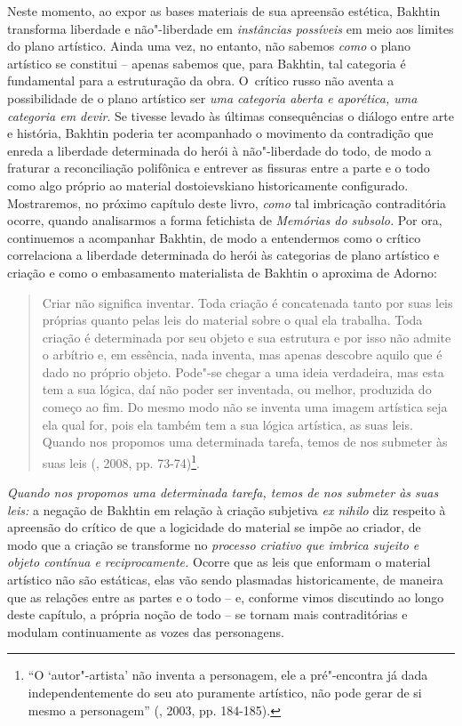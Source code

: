 {{Neste momento, ao expor as bases materiais de sua apreensão estética,
Bakhtin transforma liberdade e não"-liberdade em \emph{instâncias
possíveis} em meio aos limites do plano artístico. Ainda uma vez, no
entanto, não sabemos \emph{como} o plano artístico se constitui --
apenas sabemos que, para Bakhtin, tal categoria é fundamental para a
estruturação da obra. O~crítico russo não aventa a possibilidade de o
plano artístico ser \emph{uma categoria aberta e aporética, uma
categoria em devir}. Se tivesse levado às últimas consequências o
diálogo entre arte e história, Bakhtin poderia ter acompanhado o
movimento da contradição que enreda a liberdade determinada do herói à
não"-liberdade do todo, de modo a fraturar a reconciliação polifônica e
entrever as fissuras entre a parte e o todo como algo próprio ao
material dostoievskiano historicamente configurado. Mostraremos, no
próximo capítulo deste livro, \emph{como} tal imbricação contraditória
ocorre, quando analisarmos a forma fetichista de \emph{Memórias do
subsolo.} Por ora, continuemos a acompanhar Bakhtin, de modo a
entendermos como o crítico correlaciona a liberdade determinada do herói
às categorias de plano artístico e criação e como o embasamento
materialista de Bakhtin o aproxima de Adorno:

\begin{quote}
Criar não significa inventar. Toda criação é concatenada tanto por suas
leis próprias quanto pelas leis do material sobre o qual ela trabalha.
Toda criação é determinada por seu objeto e sua estrutura e por isso não
admite o arbítrio e, em essência, nada inventa, mas apenas descobre
aquilo que é dado no próprio objeto. Pode"-se chegar a uma ideia
verdadeira, mas esta tem a sua lógica, daí não poder ser inventada, ou
melhor, produzida do começo ao fim. Do mesmo modo não se inventa uma
imagem artística seja ela qual for, pois ela também tem a sua lógica
artística, as suas leis. Quando nos propomos uma determinada tarefa,
temos de nos submeter às suas leis (, 2008, pp. 73-74)\footnote{``O
  `autor"-artista' não inventa a personagem, ele a pré"-encontra já dada
  independentemente do seu ato puramente artístico, não pode gerar de si
  mesmo a personagem'' (, 2003, pp. 184-185).}.
\end{quote}

\emph{Quando nos propomos uma determinada tarefa, temos de nos submeter
às suas leis:} a negação de Bakhtin em relação à criação subjetiva
\emph{ex nihilo} diz respeito à apreensão do crítico de que a logicidade
do material se impõe ao criador, de modo que a criação se transforme no
\emph{processo criativo que imbrica sujeito e objeto contínua e
reciprocamente.} Ocorre que as leis que enformam o material artístico
não são estáticas, elas vão sendo plasmadas historicamente, de maneira
que as relações entre as partes e o todo -- e, conforme vimos discutindo
ao longo deste capítulo, a própria noção de todo -- se tornam mais
contraditórias e modulam continuamente as vozes das personagens.

}}
